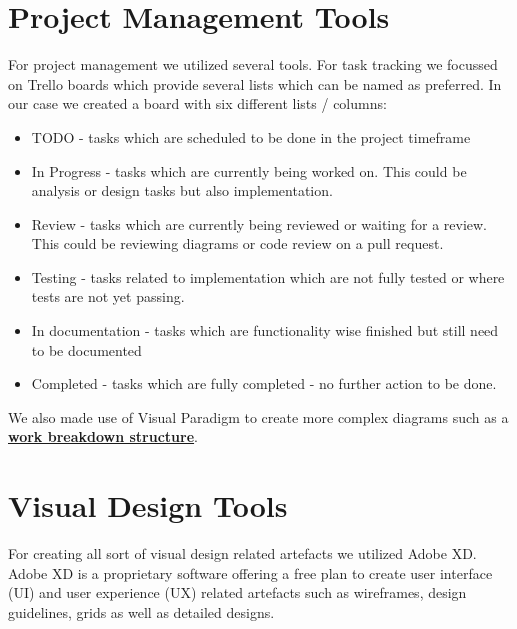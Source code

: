 \section{Project Management Tools}\label{sec:project-management-tools}

For project management we utilized several tools.
For task tracking we focussed on Trello boards which provide several lists which can be named as preferred.
In our case we created a board with six different lists / columns:

\begin{itemize}
    \item TODO - tasks which are scheduled to be done in the project timeframe
    \item In Progress - tasks which are currently being worked on.
            This could be analysis or design tasks but also implementation.
    \item Review - tasks which are currently being reviewed or waiting for a review.
            This could be reviewing diagrams or code review on a pull request.
    \item Testing - tasks related to implementation which are not fully tested or where tests are not yet passing.
    \item In documentation - tasks which are functionality wise finished but still need to be documented
    \item Completed - tasks which are fully completed - no further action to be done.
\end{itemize}

We also made use of Visual Paradigm to create more complex diagrams such as a 
\textbf{\hyperref[sec:work-breakdown-structure-(wbs)]{work breakdown structure}}.

\section{Visual Design Tools}\label{sec:visual-design-tools}

For creating all sort of visual design related artefacts we utilized Adobe XD\@.
Adobe XD is a proprietary software offering a free plan to create user interface (UI) and user experience (UX)
related artefacts such as wireframes, design guidelines, grids as well as detailed designs.

